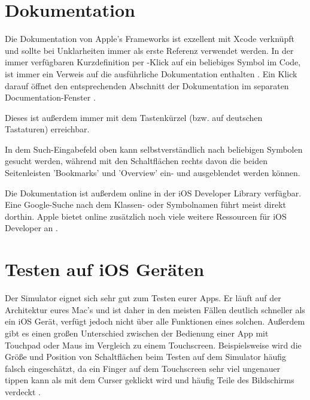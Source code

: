 \documentclass[parskip=half, final]{scrreprt}
\begin{document}
\section{Dokumentation}\label{sec:xcode_documentation}

Die Dokumentation von Apple's Frameworks ist exzellent mit Xcode verknüpft und sollte bei Unklarheiten immer als erste Referenz verwendet werden. In der immer verfügbaren Kurzdefinition per \keys{\Alt}-Klick auf ein beliebiges Symbol im Code, ist immer ein Verweis auf die ausführliche Dokumentation enthalten . Ein Klick darauf öffnet den entsprechenden Abschnitt der Dokumentation im separaten Documentation-Fenster .

Dieses ist außerdem immer mit dem Tastenkürzel  (bzw.  auf deutschen Tastaturen) erreichbar.

In dem Such-Eingabefeld oben kann selbstverständlich nach beliebigen Symbolen gesucht werden, während mit den Schaltflächen rechts davon die beiden Seitenleisten 'Bookmarks' und 'Overview' ein- und ausgeblendet werden können.


Die Dokumentation ist außerdem online in der iOS Developer Library  verfügbar. Eine Google-Suche nach dem Klassen- oder Symbolnamen führt meist direkt dorthin. Apple bietet online zusätzlich noch viele weitere Ressourcen für iOS Developer an .

\section{Testen auf iOS Geräten}\label{sec:testondevice}

Der Simulator eignet sich sehr gut zum Testen eurer Apps. Er läuft auf der Architektur eures Mac's und ist daher in den meisten Fällen deutlich schneller als ein iOS Gerät, verfügt jedoch nicht über alle Funktionen eines solchen. Außerdem gibt es einen großen Unterschied zwischen der Bedienung einer App mit Touchpad oder Maus im Vergleich zu einem Touchscreen. Beispielsweise wird die Größe und Position von Schaltflächen beim Testen auf dem Simulator häufig falsch eingeschätzt, da ein Finger auf dem Touchscreen sehr viel ungenauer tippen kann als mit dem Curser geklickt wird und häufig Teile des Bildschirms verdeckt .
\end{document}
